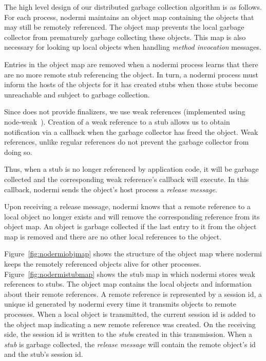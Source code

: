 
The high level design of our distributed garbage collection
algorithm is as follows.
For each process, nodermi maintains an object map containing the objects
that may still be remotely referenced.
The object map prevents the local garbage collector from prematurely garbage collecting
these objects.
This map is also necessary for looking up local objects
when handling \emph{method invocation} messages.

Entries in the object map are removed when a nodermi process learns that there
are no more remote stub referencing the object.   In turn, a nodermi
process must inform the hosts of the objects for it has created stubs
when those stubs become unreachable and subject to garbage collection.

Since \js does not provide finalizers, we use weak
references (implemented using node-weak~\cite{nodeweak}).
Creation of a weak reference to a stub allows us to obtain notification
via a callback when the garbage collector has freed the object.  Weak
references, unlike regular references do not prevent the garbage collector
from doing so.

Thus, when a stub is no longer referenced by application code, it will
be garbage collected and the corresponding weak reference's callback
will execute.  In this callback, nodermi
sends the object's host process a \emph{release message}.

Upon receiving a release message, nodermi knows that a remote
reference to a local object no longer exists and will remove the
corresponding reference from its object map.
An object is garbage collected if the last entry to it from the
object map is removed and there are no other local references to the
object.

%
%

\nodermiobjmapfig{}
\nodermistubmapfig{}

Figure~\ref{fig:nodermiobjmap} shows the structure of the object
map where nodermi keeps the remotely referenced objects
alive for other processes.
Figure~\ref{fig:nodermistubmap} shows the stub map
in which nodermi stores weak references to stubs.
The object map contains the local objects and information about their
remote references.  A remote reference is represented by a session id, a
unique id generated by nodermi every time it transmits objects to remote
processes.  When a local object is transmitted, the current session id
is added to the object map indicating a new remote reference was created.
On the receiving side, the session id is written to the \emph{stub}s
created in this transmission.  When a \emph{stub} is garbage collected,
the \emph{release message} will contain the remote object's id and
the stub's session id.

